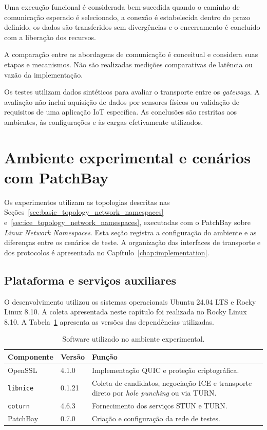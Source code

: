 Uma execução funcional é considerada bem-sucedida quando o caminho de comunicação esperado é selecionado, a conexão é estabelecida dentro do prazo definido, os dados são transferidos sem divergências e o encerramento é concluído com a liberação dos recursos.

A comparação entre as abordagens de comunicação é conceitual e considera suas etapas e mecanismos. Não são realizadas medições comparativas de latência ou vazão da implementação.

Os testes utilizam dados sintéticos para avaliar o transporte entre os \textit{gateways}. A avaliação não inclui aquisição de dados por sensores físicos ou validação de requisitos de uma aplicação IoT específica. As conclusões são restritas aos ambientes, às configurações e às cargas efetivamente utilizados.

\section{Ambiente experimental e cenários com PatchBay}
\label{sec:experimental_patchbay}

Os experimentos utilizam as topologias descritas nas Seções~\ref{sec:basic_topology_network_namespaces}  e~\ref{sec:ice_topology_network_namespaces}, executadas com o PatchBay sobre \textit{Linux Network Namespaces}. Esta seção registra a configuração do ambiente e as diferenças entre os cenários de teste. A organização das interfaces de transporte e dos protocolos é apresentada no Capítulo~\ref{chap:implementation}.

\subsection{Plataforma e serviços auxiliares}

O desenvolvimento utilizou os sistemas operacionais Ubuntu 24.04 LTS e Rocky Linux 8.10. A coleta apresentada neste capítulo foi realizada no Rocky Linux 8.10. A Tabela~\ref{tab:experimental_software} apresenta as versões das dependências utilizadas.

\begin{table}[htbp]
    \centering
    \begin{tabular}{@{}p{}p{}p{}@{}}
        \toprule
        \textbf{Componente} & \textbf{Versão} & \textbf{Função} \\
        \midrule
        OpenSSL & 4.1.0 &
        Implementação QUIC e proteção criptográfica. \\
        \texttt{libnice} & 0.1.21 &
        Coleta de candidatos, negociação ICE e transporte
        direto por \textit{hole punching} ou via TURN. \\
        \texttt{coturn} & 4.6.3 &
        Fornecimento dos serviços STUN e TURN. \\
        PatchBay & 0.7.0 &
        Criação e configuração da rede de testes. \\
        \bottomrule
    \end{tabular}
    \caption{Software utilizado no ambiente experimental.}
    \label{tab:experimental_software}
\end{table}

